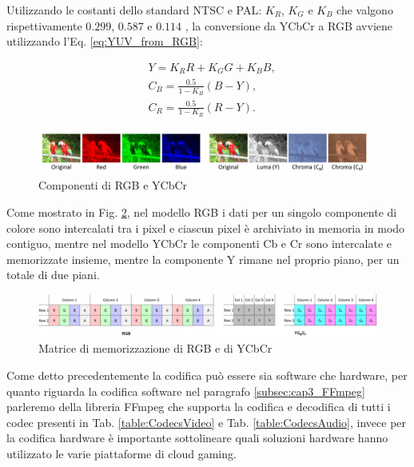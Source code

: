 Utilizzando le costanti dello standard NTSC e PAL: $K_R$, $K_G$ e $K_B$ che valgono rispettivamente $0.299$, $0.587$ e $0.114$ \parencite{VideoAndMultimediaTransmissionsOverCellularNetworks}, la conversione da YCbCr a RGB avviene utilizzando l'Eq. \ref{eq:YUV_from_RGB}:

\begin{equation} \label{eq:YUV_from_RGB}
	\begin{aligned}
		& Y = K_R R + K_G G + K_B B, \\	
		& C_B = \frac{0.5}{1 - K_B} (B - Y), \\
		& C_R = \frac{0.5}{1 - K_R} (R - Y).	
	\end{aligned}
\end{equation}

\begin{figure}[H]
	\includegraphics[width=\linewidth]{immagini/RGB_YCbCr}
	\caption{Componenti di RGB e YCbCr}
	\label{fig:RGB_YCbCr}
\end{figure}

Come mostrato in Fig. \ref{fig:RGB_YCbCr_matrix}, nel modello RGB i dati per un singolo componente di colore sono intercalati tra i pixel e ciascun pixel è archiviato in memoria in modo contiguo, mentre nel modello YCbCr le componenti Cb e Cr sono intercalate e memorizzate insieme, mentre la componente Y rimane nel proprio piano, per un totale di due piani.

\begin{figure}[H]
	\includegraphics[width=\linewidth]{immagini/RGB_YCbCr_matrix}
	\caption{Matrice di memorizzazione di RGB e di YCbCr}
	\label{fig:RGB_YCbCr_matrix}
\end{figure}

Come detto precedentemente la codifica può essere sia software che hardware, per quanto riguarda la codifica software nel paragrafo \ref{subsec:cap3_FFmpeg} parleremo della libreria FFmpeg che supporta la codifica e decodifica di tutti i codec presenti in Tab. \ref{table:CodecsVideo} e Tab. \ref{table:CodecsAudio}, invece per la codifica hardware è importante sottolineare quali soluzioni hardware hanno utilizzato le varie piattaforme di cloud gaming.

